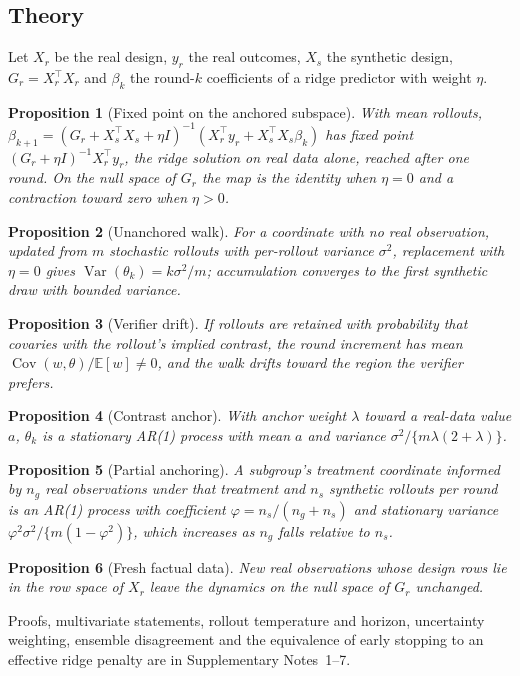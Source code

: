 \documentclass[11pt,a4paper]{article}
\newcommand{\Ex}{\mathbb E}
\newcommand{\Var}{\operatorname{Var}}
\newtheorem{proposition}{Proposition}
\begin{document}
\subsection{Theory}
Let $X_r$ be the real design, $y_r$ the real outcomes, $X_s$ the synthetic design, $G_r=X_r^\top X_r$ and $\beta_k$ the round-$k$ coefficients of a ridge predictor with weight $\eta$.
\begin{proposition}[Fixed point on the anchored subspace]\label{prop:anchor}
With mean rollouts, $\beta_{k+1}=(G_r+X_s^\top X_s+\eta I)^{-1}(X_r^\top y_r+X_s^\top X_s\beta_k)$ has fixed point $(G_r+\eta I)^{-1}X_r^\top y_r$, the ridge solution on real data alone, reached after one round. On the null space of $G_r$ the map is the identity when $\eta=0$ and a contraction toward zero when $\eta>0$.
\end{proposition}
\begin{proposition}[Unanchored walk]\label{prop:walk}
For a coordinate with no real observation, updated from $m$ stochastic rollouts with per-rollout variance $\sigma^2$, replacement with $\eta=0$ gives $\Var(\theta_k)=k\sigma^2/m$; accumulation converges to the first synthetic draw with bounded variance.
\end{proposition}
\begin{proposition}[Verifier drift]\label{prop:verifier}
If rollouts are retained with probability that covaries with the rollout's implied contrast, the round increment has mean $\operatorname{Cov}(w,\theta)/\Ex[w]\neq0$, and the walk drifts toward the region the verifier prefers.
\end{proposition}
\begin{proposition}[Contrast anchor]\label{prop:ar1}
With anchor weight $\lambda$ toward a real-data value $a$, $\theta_k$ is a stationary AR(1) process with mean $a$ and variance $\sigma^2/\{m\lambda(2+\lambda)\}$.
\end{proposition}
\begin{proposition}[Partial anchoring]\label{prop:partial}
A subgroup's treatment coordinate informed by $n_g$ real observations under that treatment and $n_s$ synthetic rollouts per round is an AR(1) process with coefficient $\varphi=n_s/(n_g+n_s)$ and stationary variance $\varphi^2\sigma^2/\{m(1-\varphi^2)\}$, which increases as $n_g$ falls relative to $n_s$.
\end{proposition}
\begin{proposition}[Fresh factual data]\label{prop:fresh}
New real observations whose design rows lie in the row space of $X_r$ leave the dynamics on the null space of $G_r$ unchanged.
\end{proposition}
Proofs, multivariate statements, rollout temperature and horizon, uncertainty weighting, ensemble disagreement and the equivalence of early stopping to an effective ridge penalty are in Supplementary Notes~1--7.
\end{document}
